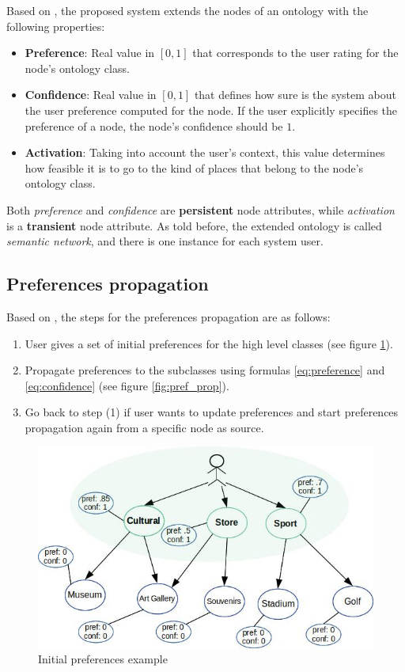Based on \cite{bahramian_abbaspour_claramunt_2017}, the proposed system extends the nodes of an ontology with the following properties:
\begin{itemize}
    \item \textbf{Preference}: Real value in $[0, 1]$ that corresponds to the user rating for the node's ontology class.
    \item \textbf{Confidence}: Real value in $[0, 1]$ that defines how sure is the system about the user preference computed for the node. If the user explicitly specifies the preference of a node, the node's confidence should be $1$.
    \item \textbf{Activation}: Taking into account the user's context, this value determines how feasible it is to go to the kind of places that belong to the node's ontology class.
\end{itemize}{}
Both \textit{preference} and \textit{confidence} are \textbf{persistent} node attributes, while \textit{activation} is a \textbf{transient} node attribute. As told before, the extended ontology is called \textit{semantic network}, and there is one instance for each system user.
 
\subsection{Preferences propagation} \label{section:preferences-propagation}
Based on \cite{bahramian_abbaspour_claramunt_2017}, the steps for the preferences propagation are as follows:
\begin{enumerate}
    \item User gives a set of initial preferences for the high level classes (see figure \ref{fig:initial_pref}).
    
    \item Propagate preferences to the subclasses using formulas \ref{eq:preference} and \ref{eq:confidence} (see figure \ref{fig:pref_prop}).
    
    \item Go back to step (1) if user wants to update preferences and start preferences propagation again from a specific node as source.
\end{enumerate}

\begin{figure}[h]
\centering
\includegraphics[scale=0.5]{draws/initial_pref.jpg}
\caption{Initial preferences example}
\label{fig:initial_pref}
\end{figure}

